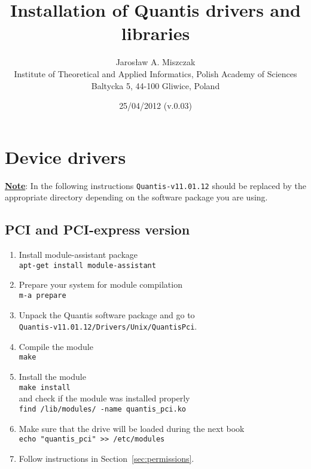 \documentclass[a4paper,11pt]{article}
\title{Installation of Quantis drivers and libraries}
\author{Jaros{\l}aw A. Miszczak\\
Institute of Theoretical and Applied Informatics, Polish Academy of Sciences\\
Baltycka 5, 44-100 Gliwice, Poland}
\date{25/04/2012 (v.0.03)}
\begin{document}
\maketitle

\section{Device drivers}

\textbf{\underline{Note}}: In the following instructions
\texttt{Quantis-v11.01.12} should be replaced by the appropriate directory
depending on the software package you are using.
\subsection{PCI and PCI-express version}
\begin{enumerate}
    \item Install module-assistant package\\ \texttt{apt-get install
    module-assistant} 
    \item Prepare your system for module compilation\\ \texttt{m-a prepare}
    \item Unpack the Quantis software package and go to\\
    \texttt{Quantis-v11.01.12/Drivers/Unix/QuantisPci}.
    \item Compile the module\\ \texttt{make}
    \item Install the module\\ \texttt{make install}\\ and check if the module was
    installed properly\\ \texttt{find /lib/modules/ -name quantis\_pci.ko}
    \item Make sure that the drive will be loaded during the next book \\ \texttt{echo "quantis\_pci" >> /etc/modules}
    \item Follow instructions in Section~\ref{sec:permissions}.
\end{enumerate}

\end{document}
